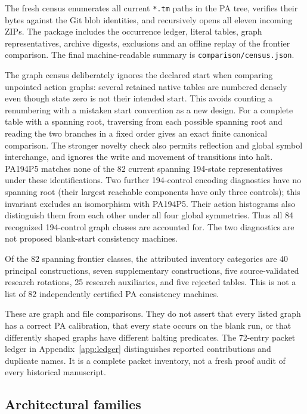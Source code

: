 \documentclass[11pt,letterpaper]{article}
\newcommand{\file}[1]{\texttt{\nolinkurl{#1}}}
\begin{document}
The fresh census enumerates all current \file{*.tm} paths in the PA
tree, verifies their bytes against the Git blob identities, and
recursively opens all eleven incoming ZIPs. The package includes
the occurrence ledger, literal tables, graph representatives,
archive digests, exclusions and an offline replay of the frontier
comparison. The final machine-readable summary is
\file{comparison/census.json}.


The graph census deliberately ignores the declared start when comparing
unpointed action graphs: several retained native tables are numbered
densely even though state zero is not their intended start. This avoids
counting a renumbering with a mistaken start convention as a new
design. For a complete table with a spanning root, traversing from
each possible spanning root and reading the two branches in a fixed
order gives an exact finite canonical comparison. The stronger
novelty check also permits reflection and global symbol interchange,
and ignores the write and movement of transitions into halt.
PA194P5 matches none of the 82 current spanning 194-state representatives
under these identifications. Two further 194-control encoding diagnostics
have no spanning root (their largest reachable components have only three
controls); this invariant excludes an isomorphism with PA194P5. Their action
histograms also distinguish them from each other under all four global
symmetries. Thus all 84 recognized 194-control graph classes are accounted
for. The two diagnostics are not proposed blank-start consistency machines.

Of the 82 spanning frontier classes, the attributed inventory categories
are 40 principal constructions, seven supplementary constructions,
five source-validated research rotations, 25 research auxiliaries, and
five rejected tables. This is not a list of 82 independently certified
PA consistency machines.

These are graph and file comparisons. They do not assert that every
listed graph has a correct PA calibration, that every state occurs
on the blank run, or that differently shaped graphs have different
halting predicates. The 72-entry packet ledger in
Appendix~\ref{app:ledger} distinguishes reported contributions and
duplicate names. It is a complete packet inventory, not a fresh
proof audit of every historical manuscript.

\clearpage
\subsection{Architectural families}
\end{document}
